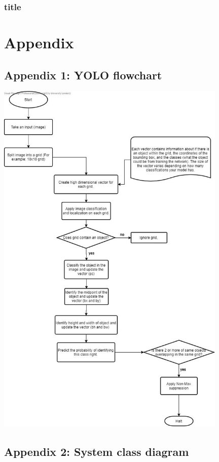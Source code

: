 \documentclass[12pt]{report}
\begin{document}
\subsection*{title}



\chapter*{Appendix}

\section*{Appendix 1: YOLO flowchart}

\includegraphics[width=110mm]{./images/YOLO.jpg}

\section*{Appendix 2: System class diagram}
\end{document}
